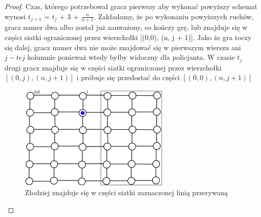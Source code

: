 \documentclass[brudnopis]{xmgr}
\theoremstyle{definition}
\begin{document}
\begin{proof}
	Czas, którego potrzebował gracz pierwszy aby wykonać powyższy schemat wynosi $t_{j+1}$ = $t_j$ + 3 + $\frac{n}{n+1}$.
	Zakładamy, że po wykonaniu powyższych ruchów, gracz numer dwa albo został już zauważony, co kończy grę, lub znajduje się w części siatki ograniczonej przez wierzchołki [(0,0), (n, j + 1)].
	\indent Jako że gra toczy się dalej, gracz numer dwa nie może znajdować się w pierwszym wierszu ani $j-tej$ kolumnie ponieważ wtedy byłby widoczny dla policjanta. W czasie $t_j$ drugi gracz znajduje się w części siatki ograniczonej przez wierzchołki $[(0,j), (n, j + 1)]$ i próbuje się przedostać do części $[(0,0), (n, j + 1)]$

	\begin{figure}[ht!]
	  \centering
	  \includegraphics[height=5cm]{rysunki/podsiatka.png}
	  \caption{Złodziej znajduje się w części siatki zaznaczonej linią przerywaną}
	\end{figure} 


\end{proof}
\end{document}
